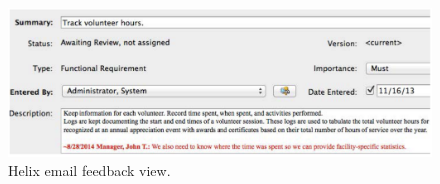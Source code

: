\begin{figure}[htbp]
    \centering
    \includegraphics[width=\linewidth]{images/edit-requirements}
    \caption{Helix email feedback view.}
    \label{fig:review_edit_feedback}
\end{figure}